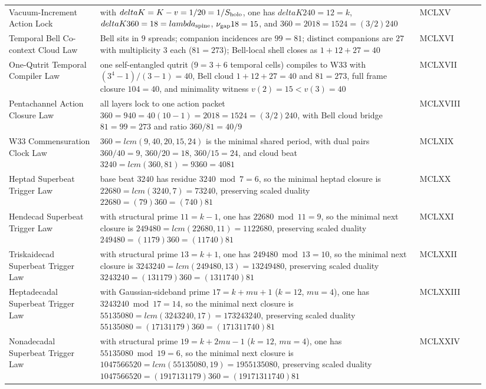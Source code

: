 \documentclass[11pt]{article}
\def\delta{delta}%
\def\lambda{lambda}%
\def\mu{mu}%
\def\cdot{ }%
\begin{document}
{\begin{longtable}{>{\raggedright\arraybackslash}p{0.18\linewidth} >{\raggedright\arraybackslash}p{0.63\linewidth} >{\raggedright\arraybackslash}p{0.13\linewidth}}
Vacuum-Increment Action Lock & with $\delta K=K-v=1/20=1/S_{\rm holo}$, one has $\delta K\cdot240=12=k$, $\delta K\cdot360=18=\lambda_{\rm spine}$, $\nu_{\rm gap}\cdot18=15$, and $360=20\cdot18=15\cdot24=(3/2)\cdot240$ & MCLXV \\
Temporal Bell Co-context Cloud Law & Bell sits in $9$ spreads; companion incidences are $9\cdot9=81$; distinct companions are $27$ with multiplicity $3$ each ($81=27\cdot3$); Bell-local shell closes as $1+12+27=40$ & MCLXVI \\
One-Qutrit Temporal Compiler Law & one self-entangled qutrit ($9=3+6$ temporal cells) compiles to W33 with $(3^4-1)/(3-1)=40$, Bell cloud $1+12+27=40$ and $81=27\cdot3$, full frame closure $10\cdot4=40$, and minimality witness $v(2)=15<v(3)=40$ & MCLXVII \\
Pentachannel Action Closure Law & all layers lock to one action packet $360=9\cdot40=40(10-1)=20\cdot18=15\cdot24=(3/2)\cdot240$, with Bell cloud bridge $81=9\cdot9=27\cdot3$ and ratio $360/81=40/9$ & MCLXVIII \\
W33 Commensuration Clock Law & $360=lcm(9,40,20,15,24)$ is the minimal shared period, with dual pairs $360/40=9$, $360/20=18$, $360/15=24$, and cloud beat $3240=lcm(360,81)=9\cdot360=40\cdot81$ & MCLXIX \\
Heptad Superbeat Trigger Law & base beat $3240$ has residue $3240\bmod 7=6$, so the minimal heptad closure is $22680=lcm(3240,7)=7\cdot3240$, preserving scaled duality $22680=(7\cdot9)\cdot360=(7\cdot40)\cdot81$ & MCLXX \\
Hendecad Superbeat Trigger Law & with structural prime $11=k-1$, one has $22680\bmod 11=9$, so the minimal next closure is $249480=lcm(22680,11)=11\cdot22680$, preserving scaled duality $249480=(11\cdot7\cdot9)\cdot360=(11\cdot7\cdot40)\cdot81$ & MCLXXI \\
Triskaidecad Superbeat Trigger Law & with structural prime $13=k+1$, one has $249480\bmod 13=10$, so the minimal next closure is $3243240=lcm(249480,13)=13\cdot249480$, preserving scaled duality $3243240=(13\cdot11\cdot7\cdot9)\cdot360=(13\cdot11\cdot7\cdot40)\cdot81$ & MCLXXII \\
Heptadecadal Superbeat Trigger Law & with Gaussian-sideband prime $17=k+\mu+1$ ($k=12$, $\mu=4$), one has $3243240\bmod 17=14$, so the minimal next closure is $55135080=lcm(3243240,17)=17\cdot3243240$, preserving scaled duality $55135080=(17\cdot13\cdot11\cdot7\cdot9)\cdot360=(17\cdot13\cdot11\cdot7\cdot40)\cdot81$ & MCLXXIII \\
Nonadecadal Superbeat Trigger Law & with structural prime $19=k+2\mu-1$ ($k=12$, $\mu=4$), one has $55135080\bmod 19=6$, so the minimal next closure is $1047566520=lcm(55135080,19)=19\cdot55135080$, preserving scaled duality $1047566520=(19\cdot17\cdot13\cdot11\cdot7\cdot9)\cdot360=(19\cdot17\cdot13\cdot11\cdot7\cdot40)\cdot81$ & MCLXXIV \\

\end{longtable}}
\end{document}
